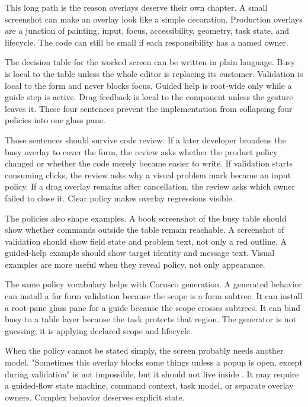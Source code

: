 This long path is the reason overlays deserve their own chapter. A small screenshot can make an overlay look like a simple decoration. Production overlays are a junction of painting, input, focus, accessibility, geometry, task state, and lifecycle. The code can still be small if each responsibility has a named owner.

The decision table for the worked screen can be written in plain language. Busy is local to the table unless the whole editor is replacing its customer. Validation is local to the form and never blocks focus. Guided help is root-wide only while a guide step is active. Drag feedback is local to the component unless the gesture leaves it. These four sentences prevent the implementation from collapsing four policies into one glass pane.

Those sentences should survive code review. If a later developer broadens the busy overlay to cover the form, the review asks whether the product policy changed or whether the code merely became easier to write. If validation starts consuming clicks, the review asks why a visual problem mark became an input policy. If a drag overlay remains after cancellation, the review asks which owner failed to close it. Clear policy makes overlay regressions visible.

The policies also shape examples. A book screenshot of the busy table should show whether commands outside the table remain reachable. A screenshot of validation should show field state and problem text, not only a red outline. A guided-help example should show target identity and message text. Visual examples are more useful when they reveal policy, not only appearance.

The same policy vocabulary helps with Corusco generation. A generated behavior can install a  for form validation because the scope is a form subtree. It can install a root-pane glass pane for a guide because the scope crosses subtrees. It can bind busy to a table layer because the task protects that region. The generator is not guessing; it is applying declared scope and lifecycle.

When the policy cannot be stated simply, the screen probably needs another model. "Sometimes this overlay blocks some things unless a popup is open, except during validation" is not impossible, but it should not live inside . It may require a guided-flow state machine, command context, task model, or separate overlay owners. Complex behavior deserves explicit state.

